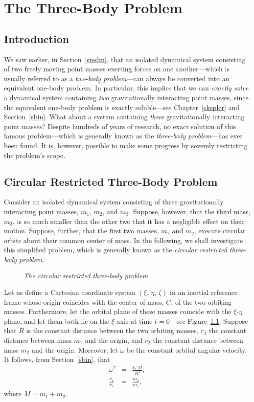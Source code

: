 \chapter{The Three-Body Problem}\label{threeb}

\section{Introduction}
We saw earlier, in Section~\ref{sredm}, that  an isolated dynamical system consisting of two
freely moving point masses exerting forces on one another---which is usually referred to
as a {\em two-body problem}---can always be converted into an equivalent
one-body problem. In particular, this implies that we can {\em exactly solve}\/ a dynamical system containing {\em two}\/ gravitationally interacting
 point masses, since the equivalent one-body problem
is exactly soluble---see Chapter~\ref{skepler} and Section~\ref{sbin}. What about a system containing
{\em three}\/ gravitationally interacting point masses? Despite hundreds of years of research, no exact solution
of this famous problem---which is generally
known as the {\em three-body problem}---has ever been found. It is, however, possible
to make some progress by severely restricting the problem's scope.

\section{Circular Restricted Three-Body Problem}
Consider an isolated dynamical system consisting of three gravitationally  interacting point masses, $m_1$, $m_2$, and $m_3$.
Suppose, however, that the third mass, $m_3$, is so much smaller than the other two that it has a negligible
effect on their motion. Suppose, further, that the first two masses, $m_1$ and $m_2$, execute circular
orbits about their common center of mass. In the following, we shall investigate this simplified problem, which  is generally known as the {\em circular restricted
three-body problem}.  

\begin{figure}
\epsfysize=2.25in
\centerline{}
\caption{\em The circular restricted three-body problem.}\label{f3b}
\end{figure}

Let us define a Cartesian coordinate system $(\xi,\,\eta,\,\zeta)$ in an inertial reference frame whose
origin coincides with the center of mass, $C$, of the two orbiting masses. Furthermore, let the orbital plane of these masses
coincide with the $\xi$-$\eta$ plane, and let them both lie on the $\xi$-axis at time $t=0$---see Figure~\ref{f3b}.
Suppose that $R$ is the constant distance between the two orbiting masses, $r_1$ the constant distance
between mass $m_1$ and the origin, and $r_2$ the constant distance between mass $m_2$ and the origin. Moreover,
let $\omega$ be the constant orbital angular velocity. It follows, from Section~\ref{sbin},
that
\begin{eqnarray}\label{e14.1}
\omega^2 &=& \frac{G\,M}{R^3},\\[0.5ex]
\frac{r_1}{r_2} &=& \frac{m_2}{m_1},
\end{eqnarray}
where $M=m_1+m_2$.


